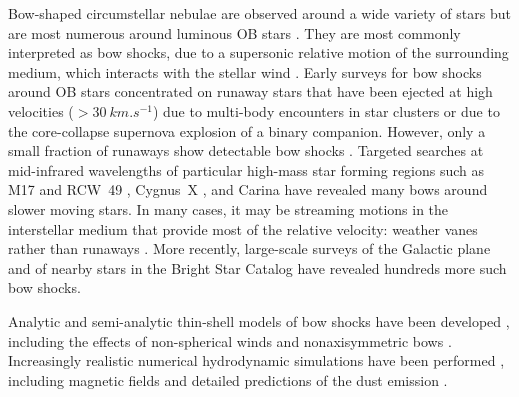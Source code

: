 \documentclass[useAMS, usenatbib, a4paper]{mnras}
\newcommand\hii{\ion{H}{ii}}
\begin{document}
Bow-shaped circumstellar nebulae are observed around a wide variety of
stars \citep{Gull:1979a, Cox:2012a, Cordes:1993a} but are most
numerous around luminous OB stars \citep{Kobulnicky:2016a}.  They are
most commonly interpreted as bow shocks, due to a supersonic relative
motion of the surrounding medium, which interacts with the stellar
wind \citep{Wilkin:1996a}.  Early surveys for bow shocks around OB
stars \citep{van-Buren:1995a} concentrated on runaway stars
\citep{Blaauw:1961a, Hoogerwerf:2001a} that have been ejected at high
velocities (\(> \SI{30}{km.s^{-1}}\)) due to multi-body encounters in
star clusters or due to the core-collapse supernova explosion of a
binary companion.  However, only a small fraction of runaways show
detectable bow shocks \citep{Huthoff:2002a, Peri:2012a, Peri:2015a,
  Prisegen:2019a}. Targeted searches at mid-infrared wavelengths of
particular high-mass star forming regions such as M17 and RCW~49
\citep{Povich:2008a}, Cygnus~X \citep{Kobulnicky:2010a}, and Carina
\citep{Sexton:2015b} have revealed many bows around slower moving
stars.  In many cases, it may be streaming motions in the interstellar
medium that provide most of the relative velocity: weather vanes
rather than runaways \citep{Povich:2008a}.  More recently, large-scale
surveys of the Galactic plane \citep{Kobulnicky:2016a,
  Kobulnicky:2017a} and of nearby stars in the Bright Star Catalog
\citep{Bodensteiner:2018a} have revealed hundreds more such bow shocks.

Analytic and semi-analytic thin-shell models of bow shocks have been
developed \citep{van-Buren:1992a, Wilkin:1996a, Canto:1996},
including the effects of non-spherical winds and nonaxisymmetric bows
\citep{Wilkin:2000a, Henney:2002a, Canto:2005a, Tarango-Yong:2018a}.
Increasingly realistic numerical hydrodynamic simulations have been
performed \citep{Matsuda:1989a, Raga:1997a, Comeron:1998a, Arthur:2006a,
  Meyer:2014b, Mackey:2015a}, including magnetic fields
\citep{Meyer:2017a, Katushkina:2017a, Katushkina:2018a} and detailed
predictions of the dust emission \citep{Meyer:2016a, Acreman:2016a,
  Mackey:2016a}.

\end{document}
